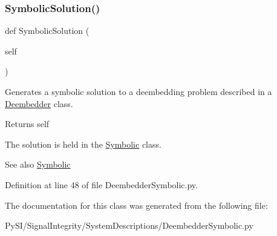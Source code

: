 \subsubsection{\texorpdfstring{Symbolic\+Solution()}{SymbolicSolution()}}
{\footnotesize\ttfamily def Symbolic\+Solution (\begin{DoxyParamCaption}\item[{}]{self }\end{DoxyParamCaption})}



Generates a symbolic solution to a deembedding problem described in a \hyperlink{namespaceSignalIntegrity_1_1SystemDescriptions_1_1Deembedder}{Deembedder} class. 

\begin{DoxyReturn}{Returns}
self
\end{DoxyReturn}
The solution is held in the \hyperlink{namespaceSignalIntegrity_1_1SystemDescriptions_1_1Symbolic}{Symbolic} class.

\begin{DoxySeeAlso}{See also}
\hyperlink{namespaceSignalIntegrity_1_1SystemDescriptions_1_1Symbolic}{Symbolic} 
\end{DoxySeeAlso}


Definition at line 48 of file Deembedder\+Symbolic.\+py.



The documentation for this class was generated from the following file\+:\begin{DoxyCompactItemize}
\item 
Py\+S\+I/\+Signal\+Integrity/\+System\+Descriptions/Deembedder\+Symbolic.\+py\end{DoxyCompactItemize}
